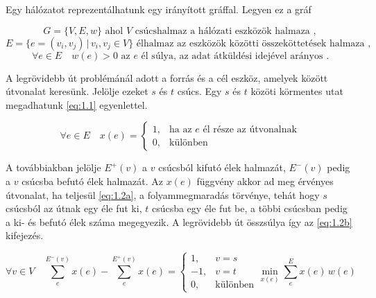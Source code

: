 \documentclass[a4paper,oneside]{article}
\newcommand{\inedge}[1]{E^-(#1)}
\newcommand{\outedge}[1]{E^+(#1)}
\begin{document}
Egy hálózatot reprezentálhatunk egy irányított gráffal. Legyen ez a gráf

$$G = \lbrace V, E, w \rbrace \text{ ahol } V \text{ csúcshalmaz a hálózati eszközök halmaza },$$
$$E = \lbrace e = (v_i, v_j) \, \vert \, v_i, v_j \in V \rbrace \text{ élhalmaz az eszközök közötti összeköttetések halmaza },$$
$$\forall e \in E \quad w(e) > 0 \text{ az $e$ él súlya, az adat átküldési idejével arányos }.$$

A legrövidebb út problémánál adott a forrás és a cél eszköz, amelyek között útvonalat keresünk.
Jelölje ezeket $s$ és $t$ csúcs.
Egy $s$ és $t$ közöti körmentes utat megadhatunk \eqref{eq:1.1} egyenlettel.

\begin{equation}
  \forall e \in E \quad x(e) = \begin{cases}
    1, & \text{ha az $e$ él része az útvonalnak}\\
    0, & \text{különben}
  \end{cases} \label{eq:1.1}
\end{equation}

A továbbiakban jelölje $\outedge{v}$ a $v$ csúcsból kifutó élek halmazát,
$\inedge{v}$ pedig a $v$ csúcsba befutó élek halmazát.
Az $x(e)$ függvény akkor ad meg érvényes útvonalat, ha teljesül \eqref{eq:1.2a}, a folyammegmaradás törvénye,
tehát hogy $s$ csúcsból az útnak egy éle fut ki, $t$ csúcsba egy éle fut be,
a többi csúcsban pedig a ki- és befutó élek száma megegyezik.
A legrövidebb út összsúlya így az \eqref{eq:1.2b} kifejezés.

\begin{subequations}
  \begin{equation}
    \forall v \in V \quad \sum_{e}^{\inedge{v}}x(e) - \sum_{e}^{\outedge{v}}x(e) = \begin{cases}
      1, & v = s \\
      -1, & v = t\\
      0, & \text{különben}
    \end{cases} \label{eq:1.2a}
  \end{equation}
  \begin{equation}
    \min_{x(e)} \sum_{e}^{E} x(e) \, w(e) \label{eq:1.2b}
  \end{equation}
\end{subequations}
\end{document}
